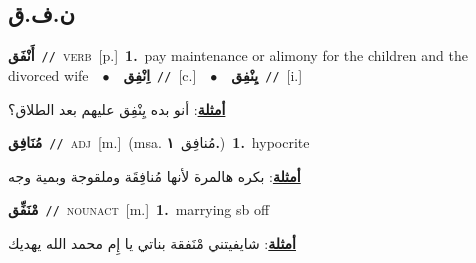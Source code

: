 \documentclass[10pt,a4paper,twoside]{article} %
\begin{document}
\begin{multicols}{2}
\vspace{-3mm}
\subsection*{\color{blue}\foreignlanguage{arabic}{ن.ف.ق}\color{blue}{}} 

{\setlength\topsep{0pt}\textbf{\foreignlanguage{arabic}{أَنْفَق}}\ {\color{gray}\texttt{//}\color{black}}\ \textsc{verb}\ [p.]\ \textbf{1.}~pay maintenance or alimony for the children and the divorced wife\ \ $\bullet$\ \ \setlength\topsep{0pt}\textbf{\foreignlanguage{arabic}{اِنْفِق}}\ {\color{gray}\texttt{//}\color{black}}\ [c.]\ \ $\bullet$\ \ \setlength\topsep{0pt}\textbf{\foreignlanguage{arabic}{يِنْفِق}}\ {\color{gray}\texttt{//}\color{black}}\ [i.]\  \begin{flushright}\color{gray}\foreignlanguage{arabic}{\textbf{\underline{\foreignlanguage{arabic}{أمثلة}}}: أنو بده يِنْفِق عليهم بعد الطلاق؟}\end{flushright}\color{black}} \vspace{2mm}

{\setlength\topsep{0pt}\textbf{\foreignlanguage{arabic}{مُنَافِق}}\ {\color{gray}\texttt{//}\color{black}}\ \textsc{adj}\ [m.]\ \color{gray}(msa. \foreignlanguage{arabic}{مُنافِق}~\foreignlanguage{arabic}{\textbf{١.}})\color{black}\ \textbf{1.}~hypocrite\  \begin{flushright}\color{gray}\foreignlanguage{arabic}{\textbf{\underline{\foreignlanguage{arabic}{أمثلة}}}: بكره هالمرة لأنها مُنافِقَة وملقوجة وبمية وجه}\end{flushright}\color{black}} \vspace{2mm}

{\setlength\topsep{0pt}\textbf{\foreignlanguage{arabic}{مْنَفِّق}}\ {\color{gray}\texttt{//}\color{black}}\ \textsc{noun\textunderscore act}\ [m.]\ \textbf{1.}~marrying sb off\  \begin{flushright}\color{gray}\foreignlanguage{arabic}{\textbf{\underline{\foreignlanguage{arabic}{أمثلة}}}: شايفيتني مْنَفقة بناتي يا إِم محمد الله يهديك}\end{flushright}\color{black}} \vspace{2mm}


\end{multicols}
\end{document}
